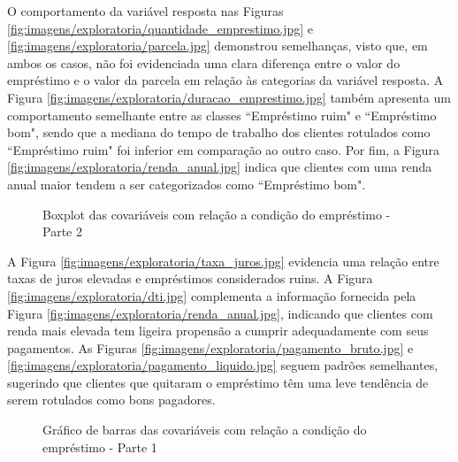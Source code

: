O comportamento da variável resposta nas Figuras \ref{fig:imagens/exploratoria/quantidade_emprestimo.jpg} 
e \ref{fig:imagens/exploratoria/parcela.jpg} demonstrou semelhanças, visto que, em ambos os casos,
não foi evidenciada uma clara diferença entre o valor do empréstimo e o valor da parcela em relação às
categorias da variável resposta. A Figura \ref{fig:imagens/exploratoria/duracao_emprestimo.jpg} 
também apresenta um comportamento semelhante entre as classes
``Empréstimo ruim" e ``Empréstimo bom", sendo que a mediana do tempo de trabalho dos clientes rotulados 
como ``Empréstimo ruim" foi inferior em comparação ao outro caso. Por fim, a Figura \ref{fig:imagens/exploratoria/renda_anual.jpg} 
indica que clientes 
com uma renda anual maior tendem a ser categorizados como ``Empréstimo bom".


\begin{figure}[H]
  \centering
  \vspace{.5cm}
  \vspace{.5cm}
 \caption{Boxplot das covariáveis com relação a condição do empréstimo - Parte 2}
  
 \label{fig:exp_boxplot2}
\end{figure}

A Figura \ref{fig:imagens/exploratoria/taxa_juros.jpg} evidencia uma relação entre taxas de juros elevadas e empréstimos 
considerados ruins. A Figura \ref{fig:imagens/exploratoria/dti.jpg} complementa a informação fornecida pela 
Figura \ref{fig:imagens/exploratoria/renda_anual.jpg},
indicando que clientes com renda mais elevada tem ligeira propensão a cumprir adequadamente com seus pagamentos.
As Figuras \ref{fig:imagens/exploratoria/pagamento_bruto.jpg} e  \ref{fig:imagens/exploratoria/pagamento_liquido.jpg} 
seguem padrões semelhantes, sugerindo que clientes que quitaram o empréstimo têm uma leve
tendência de serem rotulados como bons pagadores.

\begin{figure}[H]
    \centering
    \vspace{.5cm}
    \vspace{.5cm}
    
    \label{fig:exp_bar1}
    \caption{Gráfico de barras das covariáveis com relação a condição do empréstimo - Parte 1}
\end{figure}


